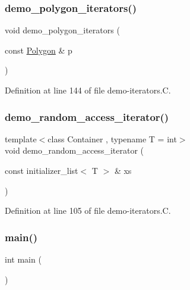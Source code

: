 \subsubsection{\texorpdfstring{demo\+\_\+polygon\+\_\+iterators()}{demo\_polygon\_iterators()}}
{\footnotesize\ttfamily void demo\+\_\+polygon\+\_\+iterators (\begin{DoxyParamCaption}\item[{const \hyperlink{class_designar_1_1_polygon}{Polygon} \&}]{p }\end{DoxyParamCaption})}



Definition at line 144 of file demo-\/iterators.\+C.

\mbox{\label{demo-iterators_8_c_ad21d9d25e5563ab0ee7ebd1a3092b1df}} 
\subsubsection{\texorpdfstring{demo\+\_\+random\+\_\+access\+\_\+iterator()}{demo\_random\_access\_iterator()}}
{\footnotesize\ttfamily template$<$class Container , typename T  = int$>$ \\
void demo\+\_\+random\+\_\+access\+\_\+iterator (\begin{DoxyParamCaption}\item[{const initializer\+\_\+list$<$ T $>$ \&}]{xs }\end{DoxyParamCaption})}



Definition at line 105 of file demo-\/iterators.\+C.

\mbox{\label{demo-iterators_8_c_ae66f6b31b5ad750f1fe042a706a4e3d4}} 
\subsubsection{\texorpdfstring{main()}{main()}}
{\footnotesize\ttfamily int main (\begin{DoxyParamCaption}{ }\end{DoxyParamCaption})}




